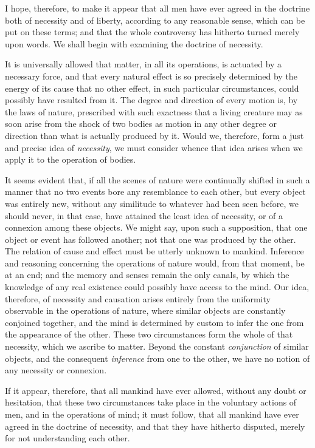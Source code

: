 \documentclass[]{article}
\begin{document}
\begin{sectionbody}
\humeparagraph  I hope, therefore, to make it appear that all men have ever agreed in the doctrine both of necessity and of liberty, according to any reasonable sense, which can be put on these terms; and that the whole controversy has hitherto turned merely upon words. We shall begin with examining the doctrine of necessity.

\humeparagraph  It is universally allowed that matter, in all its operations, is actuated by a necessary force, and that every natural effect is so precisely determined by the energy of its cause that no other effect, in such particular circumstances, could possibly have resulted from it. The degree and direction of every motion is, by the laws of nature, prescribed with such exactness that a living creature may as soon arise from the shock of two bodies as motion in any other degree or direction than what is actually produced by it. Would we, therefore, form a just and precise idea of \emph{necessity}, we must consider whence that idea arises when we apply it to the operation of bodies.

\humeparagraph  It seems evident that, if all the scenes of nature were continually shifted in such a manner that no two events bore any resemblance to each other, but every object was entirely new, without any similitude to whatever had been seen before, we should never, in that case, have attained the least idea of necessity, or of a connexion among these objects. We might say, upon such a supposition, that one object or event has followed another; not that one was produced by the other. The relation of cause and effect must be utterly unknown to mankind. Inference and reasoning concerning the operations of nature would, from that moment, be at an end; and the memory and senses remain the only canals, by which the knowledge of any real existence could possibly have access to the mind. Our idea, therefore, of necessity and causation arises entirely from the uniformity observable in the operations of nature, where similar objects are constantly conjoined together, and the mind is determined by custom to infer the one from the appearance of the other. These two circumstances form the whole of that necessity, which we ascribe to matter. Beyond the constant \emph{conjunction} of similar objects, and the consequent \emph{inference} from one to the other, we have no notion of any necessity or connexion.

\humeparagraph  If it appear, therefore, that all mankind have ever allowed, without any doubt or hesitation, that these two circumstances take place in the voluntary actions of men, and in the operations of mind; it must follow, that all mankind have ever agreed in the doctrine of necessity, and that they have hitherto disputed, merely for not understanding each other.


\end{sectionbody}
\end{document}
